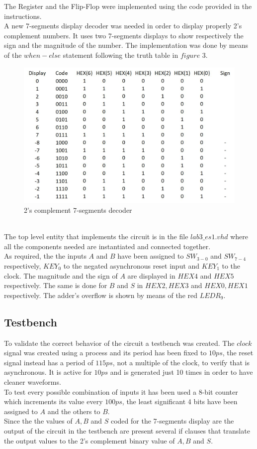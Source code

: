 \documentclass[12pt]{article}
\begin{document}
The Register and the Flip-Flop were implemented using the code provided in the instructions.\\
A new 7-segments display decoder was needed in order to display properly 2's complement numbers. It uses two 7-segments displays to show respectively the sign and the magnitude of the number. The implementation was done by means of the $when-else$ statement following the truth table in $figure$ $3$.
\begin{figure}[h]
	\centering
	\includegraphics[scale = 0.7]{immagini/B3.jpg}
	\caption{2's complement 7-segments decoder}
\end{figure}\\
The top level entity that implements the circuit is in the file $lab3\_es1.vhd$ where all the components needed are instantiated and connected together.\\ As required, the the inputs $A$ and $B$ have been assigned to $SW_{3-0}$ and $SW_{7-4}$ respectively, $KEY_0$ to the negated asynchronous reset input and $KEY_1$ to the clock. The magnitude and the sign of $A$ are displayed in $HEX4$ and $HEX5$ respectively. The same is done for $B$ and $S$ in $HEX2,HEX3$ and $HEX0,HEX1$ respectively. The adder's overflow is shown by means of the red $LEDR_9$.\\

\subsection{Testbench}
To validate the correct behavior of the circuit a testbench was created. The $clock$ signal was created using a process and its period has been fixed to $10ps$, the reset signal instead has a period of $115ps$, not a multiple of the clock, to verify that is asynchronous. It  is active for $10ps$ and is generated just 10 times in order to have cleaner waveforms.\\
To test every possible combination of inputs it has been used a 8-bit counter which increments its value every $100ps$, the least significant 4 bits have been assigned to $A$ and the others to $B$.\\
Since the the values of $A,B$ and $S$ coded for the 7-segments display are the output of the circuit in the testbench are present several if clauses that  translate the output values to the 2's complement binary value of $A,B$ and $S$.\\
\\
\end{document}
